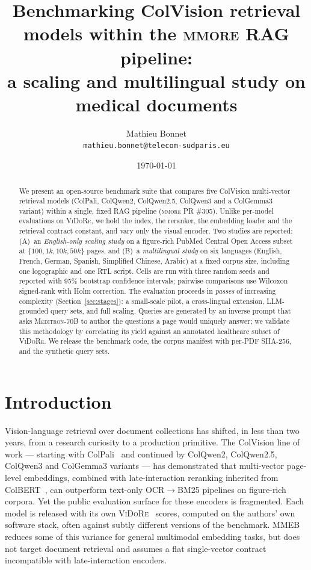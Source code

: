 \documentclass[10pt,a4paper]{article}
\title{Benchmarking ColVision retrieval models within the \textsc{mmore} RAG pipeline:\\
a scaling and multilingual study on medical documents}
\author{Mathieu Bonnet \\ \texttt{mathieu.bonnet@telecom-sudparis.eu}}
\date{\today}
\begin{document}
\maketitle

\begin{abstract}
We present an open-source benchmark suite that compares five ColVision
multi-vector retrieval models (ColPali, ColQwen2, ColQwen2.5, ColQwen3 and a
ColGemma3 variant) within a single, fixed RAG pipeline (\textsc{mmore} PR
\#305). Unlike per-model evaluations on \textsc{ViDoRe}, we hold the index,
the reranker, the embedding loader and the retrieval contract constant, and
vary only the visual encoder. Two studies are reported: (A)~an
\emph{English-only scaling study} on a figure-rich PubMed Central Open Access
subset at $\{100, 1k, 10k, 50k\}$ pages, and (B)~a \emph{multilingual study}
on six languages (English, French, German, Spanish, Simplified Chinese,
Arabic) at a fixed corpus size, including one logographic and one RTL
script. Cells are run with three random seeds and reported with 95\%
bootstrap confidence intervals; pairwise comparisons use Wilcoxon signed-rank
with Holm correction. The evaluation proceeds in \emph{passes} of increasing
complexity (Section~\ref{sec:stages}): a small-scale pilot, a cross-lingual
extension, LLM-grounded query sets, and full scaling. Queries are generated by an inverse prompt that asks
\textsc{Meditron}-70B to author the questions a page would uniquely answer; we
validate this methodology by correlating its yield against an annotated
healthcare subset of \textsc{ViDoRe}. We release the benchmark code, the
corpus manifest with per-PDF SHA-256, and the synthetic query sets.
\end{abstract}

\section{Introduction}

Vision-language retrieval over document collections has shifted, in less than
two years, from a research curiosity to a production primitive. The ColVision
line of work --- starting with ColPali~\cite{faysse2024colpali} and continued
by ColQwen2, ColQwen2.5, ColQwen3 and ColGemma3 variants --- has demonstrated
that multi-vector page-level embeddings, combined with late-interaction
reranking inherited from ColBERT~\cite{khattab2020colbert}, can outperform
text-only OCR$\rightarrow$BM25 pipelines on figure-rich corpora. Yet the
public evaluation surface for these encoders is fragmented. Each model is
released with its own \textsc{ViDoRe}~\cite{faysse2024vidore} scores, computed
on the authors' own software stack, often against subtly different versions
of the benchmark. \textsc{MMEB}~\cite{wei2025mmeb} reduces some of this
variance for general multimodal embedding tasks, but does not target document
retrieval and assumes a flat single-vector contract incompatible with
late-interaction encoders.
\end{document}
